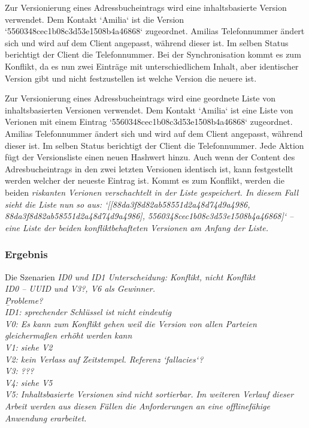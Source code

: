 \begin{description}[leftmargin=0.5cm,style=nextline]
  \item[Szenario V5:]%
  Zur Versionierung eines Adressbucheintrags wird eine inhaltsbasierte Version verwendet. Dem Kontakt `Amilia` ist die Version `5560348cec1b08c3d53e1508b4a46868` zugeordnet. Amilias Telefonnummer ändert sich und wird auf dem Client angepasst, während dieser  ist. Im selben Status berichtigt der Client die Telefonnummer. Bei der Synchronisation kommt es zum Konflikt, da es nun zwei Einträge mit unterschiedlichem Inhalt, aber identischer Version gibt und nicht festzustellen ist welche Version die neuere ist.\\
  \item[Szenario V6:] %
  Zur Versionierung eines Adressbucheintrags wird eine geordnete Liste von inhaltsbasierten Versionen verwendet.
  Dem Kontakt `Amilia` ist eine Liste von Verionen mit einem Eintrag `5560348cec1b08c3d53e1508b4a46868` zugeordnet. Amilias Telefonnummer ändert sich und wird auf dem Client angepasst, während dieser  ist. Im selben Status berichtigt der Client die Telefonnummer. Jede Aktion fügt der Versionsliste einen neuen Hashwert hinzu. Auch wenn der Content des Adresbucheintrags in den zwei letzten Versionen identisch ist, kann festgestellt werden welcher der neueste Eintrag ist. Kommt es zum Konflikt, werden die beiden \it{riskanten} Verionen verschachtelt in der Liste gespeichert. In diesem Fall sieht die Liste nun so aus: `[[88da3f8d82ab58551d2a48d74d9a4986, 88da3f8d82ab58551d2a48d74d9a4986], 5560348cec1b08c3d53e1508b4a46868]` -- eine Liste der beiden konfliktbehafteten Versionen am Anfang der Liste.
\end{description}
%
%
\subsubsection*{Ergebnis}
Die Szenarien \it{ID0} und \it{ID1}
Unterscheidung: Konflikt, nicht Konflikt\\
ID0 -- UUID und V3?, V6 als Gewinner.\\
\b{Probleme?}\\
ID1: sprechender Schlüssel ist nicht eindeutig\\
V0: Es kann zum Konflikt gehen weil die Version von allen Parteien gleichermaßen erhöht werden kann\\
V1: siehe V2\\
V2: kein Verlass auf Zeitstempel. Referenz `fallacies`?\\
V3: ??? \\
V4: siehe V5\\
V5: Inhaltsbasierte Versionen sind nicht sortierbar.
Im weiteren Verlauf dieser Arbeit werden aus diesen Fällen die Anforderungen an eine offlinefähige Anwendung erarbeitet.